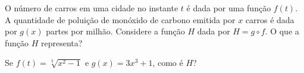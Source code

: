 O número de carros em uma cidade no instante $t$ é dada por uma função $f(t)$.
A quantidade de poluição de monóxido de carbono emitida por $x$ carros é dada por
$g(x)$ partes por milhão.
Considere a função $H$ dada por $H=g\circ f$.
O que a função $H$ representa?

Se $f(t)=\sqrt[3]{x^2-1}$ e $g(x)=3x^3+1$, como é $H$?
